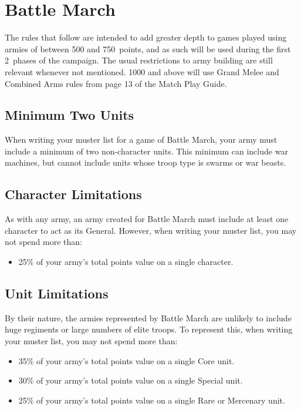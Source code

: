\section{Battle March}

The rules that follow are intended to add greater depth to games played using armies of between 500 and 750~points, and as such will be used during the first 2~phases of the campaign. The usual restrictions to army building are still relevant whenever not mentioned.
1000 and above will use Grand Melee and Combined Arms rules from page 13 of the Match Play Guide.

\subsection{Minimum Two Units}

When writing your muster list for a game of Battle March, your army must include a minimum of two non-character units. This minimum can include war machines, but cannot include units whose troop type is swarms or war beasts.

\subsection{Character Limitations}

As with any army, an army created for Battle March must include at least one character to act as its General. However, when writing your muster list, you may not spend more than:
\begin{itemize}
  \item 25\% of your army's total points value on a single character.
\end{itemize}

\subsection{Unit Limitations}

By their nature, the armies represented by Battle March are unlikely to include huge regiments or large numbers of elite troops. To represent this, when writing your muster list, you may not spend more than:
\begin{itemize}
  \item 35\% of your army's total points value on a single Core unit.
  \item 30\% of your army's total points value on a single Special unit.
  \item 25\% of your army's total points value on a single Rare or Mercenary unit.
\end{itemize}

